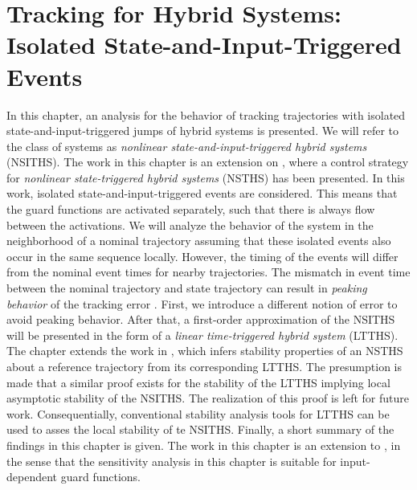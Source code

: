 \documentclass[../DC2017114Bouma.tex]{subfiles}
\begin{document}
\graphicspath{{03_Contribution/img/}}
\renewcommand{\chaptermark}[1]{\markboth{\thechapter.\ #1}{}}
\renewcommand{\sectionmark}[1]{\markright{#1}{}}

\pagestyle{fancyreport}
\cleartooddpage
\pagestyle{fancyreport}
\chapter{Tracking for Hybrid Systems: Isolated State-and-Input-Triggered Events}\label{ch:order}
In this chapter, an analysis for the behavior of tracking trajectories with isolated state-and-input-triggered jumps of hybrid systems is presented. We will refer to the class of systems as \textit{nonlinear state-and-input-triggered hybrid systems} (NSITHS). The work in this chapter is an extension on \cite{Saccon2014,Rijnen2017}, where a control strategy for \textit{nonlinear state-triggered hybrid systems} (NSTHS) has been presented. In this work, isolated state-and-input-triggered events are considered. This means that the guard functions are activated separately, such that there is always flow between the activations. We will analyze the behavior of the system in the neighborhood of a nominal trajectory assuming that these isolated events also occur in the same sequence locally. However, the timing of the events will differ from the nominal event times for nearby trajectories. The mismatch in event time between the nominal trajectory and state trajectory can result in \textit{peaking behavior} of the tracking error \cite{Menini2001,Biemond2013}. First, we introduce a different notion of error to avoid peaking behavior. After that, a first-order approximation of the NSITHS will be presented in the form of a \textit{linear time-triggered hybrid system} (LTTHS). The chapter extends the work in \cite{Rijnen2017}, which infers stability properties of an NSTHS about a reference trajectory from its corresponding LTTHS. The presumption is made that a similar proof exists for the stability of the LTTHS implying local asymptotic stability of the NSITHS. The realization of this proof is left for future work. Consequentially, conventional stability analysis tools for LTTHS can be used to asses the local stability of te NSITHS. Finally, a short summary of the findings in this chapter is given. The work in this chapter is an extension to \cite{Rijnen2017}, in the sense that the sensitivity analysis in this chapter is suitable for input-dependent guard functions.
%
%
\end{document}

